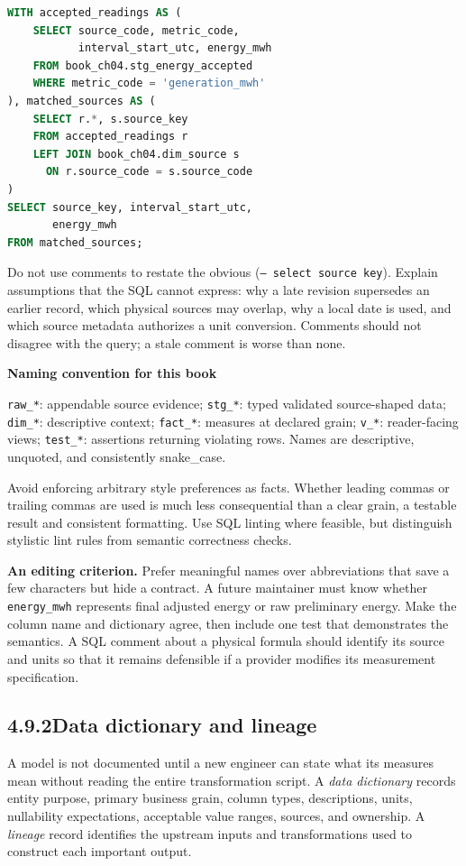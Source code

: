\documentclass[11pt,twoside]{article}
\newcommand{\topic}[2]{\subsection*{#1\quad #2}}
\begin{document}
\begin{lstlisting}[language=SQL,caption={A readability-oriented transformation sketch.}]
WITH accepted_readings AS (
    SELECT source_code, metric_code,
           interval_start_utc, energy_mwh
    FROM book_ch04.stg_energy_accepted
    WHERE metric_code = 'generation_mwh'
), matched_sources AS (
    SELECT r.*, s.source_key
    FROM accepted_readings r
    LEFT JOIN book_ch04.dim_source s
      ON r.source_code = s.source_code
)
SELECT source_key, interval_start_utc,
       energy_mwh
FROM matched_sources;
\end{lstlisting}

Do not use comments to restate the obvious (\texttt{-- select source key}). Explain assumptions that the SQL cannot express: why a late revision supersedes an earlier record, which physical sources may overlap, why a local date is used, and which source metadata authorizes a unit conversion. Comments should not disagree with the query; a stale comment is worse than none.

\begin{whitebox}\textbf{Naming convention for this book}\par
\texttt{raw\_*}: appendable source evidence; \texttt{stg\_*}: typed validated source-shaped data; \texttt{dim\_*}: descriptive context; \texttt{fact\_*}: measures at declared grain; \texttt{v\_*}: reader-facing views; \texttt{test\_*}: assertions returning violating rows. Names are descriptive, unquoted, and consistently snake\_case.\end{whitebox}

Avoid enforcing arbitrary style preferences as facts. Whether leading commas or trailing commas are used is much less consequential than a clear grain, a testable result and consistent formatting. Use SQL linting where feasible, but distinguish stylistic lint rules from semantic correctness checks.


\textbf{An editing criterion.} Prefer meaningful names over abbreviations that save a few characters but hide a contract. A future maintainer must know whether \texttt{energy\_mwh} represents final adjusted energy or raw preliminary energy. Make the column name and dictionary agree, then include one test that demonstrates the semantics. A SQL comment about a physical formula should identify its source and units so that it remains defensible if a provider modifies its measurement specification.

\newpage
\topic{4.9.2}{Data dictionary and lineage}
A model is not documented until a new engineer can state what its measures mean without reading the entire transformation script. A \emph{data dictionary} records entity purpose, primary business grain, column types, descriptions, units, nullability expectations, acceptable value ranges, sources, and ownership. A \emph{lineage} record identifies the upstream inputs and transformations used to construct each important output.
\end{document}
